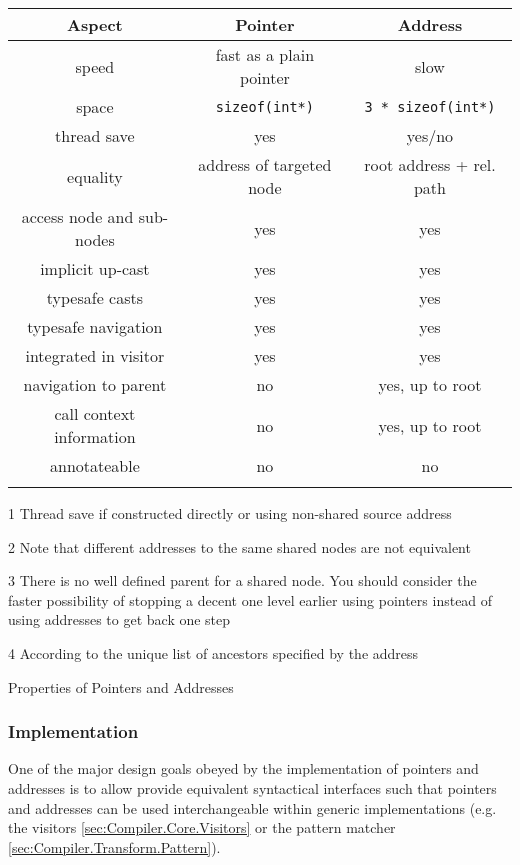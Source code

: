 \begin{threeparttable}[1h]
	\centering
	\begin{tabular}{c|c|c}
		\textbf{Aspect} & \textbf{Pointer} & \textbf{Address} \\
		\hline \hline
		speed & fast as a plain pointer    & slow \\
		space & \lstinline|sizeof(int*)|   & \lstinline|3 * sizeof(int*)| \\
		thread save & yes & yes/no\tnote{1} \\
		\hline
		equality & address of targeted node & root address + rel. path\tnote{2}
		\\
		\hline
		access node and sub-nodes  & yes & yes \\
		implicit up-cast & yes & yes \\
		typesafe casts & yes & yes \\
		typesafe navigation & yes & yes \\
		integrated in visitor & yes & yes \\
		navigation to parent & no\tnote{3} & yes, up to root\tnote{4} \\
		call context information & no & yes, up to root \\
		annotateable & no & no \\
		\hline
		\multicolumn{3}{c}{} \\
	\end{tabular}
	\begin{tablenotes}
		\item[1] Thread save if constructed directly or using non-shared source
		address
		\item[2] Note that different addresses to the same shared nodes are not
		equivalent
		\item[3] There is no well defined parent for a shared node. You
		should consider the faster possibility of stopping a decent one level earlier
		using pointers instead of using addresses to get back one step
		\item[4]According to the unique list of ancestors specified by the address
	\end{tablenotes}
	\caption{Properties of Pointers and Addresses}
	\label{tab:Compiler.Core.ptr.a.addr}
\end{threeparttable}


\subsubsection{Implementation}
One of the major design goals obeyed by the implementation of pointers and
addresses is to allow provide equivalent syntactical interfaces such that
pointers and addresses can be used interchangeable within generic
implementations (e.g. the visitors \ref{sec:Compiler.Core.Visitors} or the
pattern matcher \ref{sec:Compiler.Transform.Pattern}).


